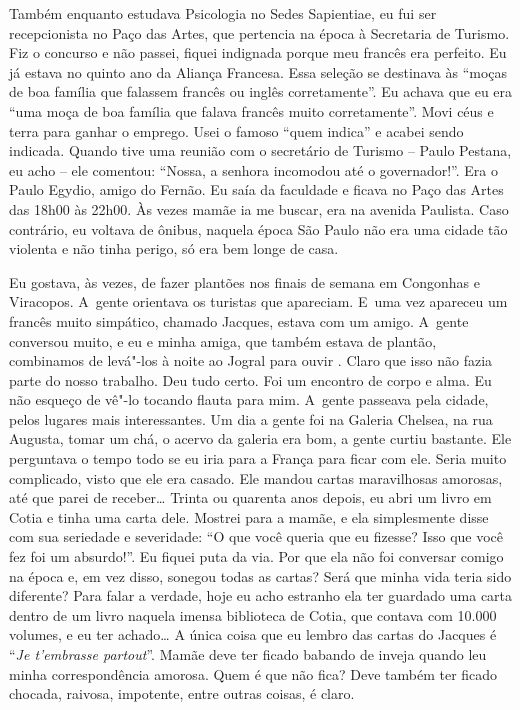 Também enquanto estudava Psicologia no Sedes Sapientiae, eu fui ser
recepcionista no Paço das Artes, que pertencia na época à Secretaria de
Turismo. Fiz o concurso e não passei, fiquei indignada porque meu
francês era perfeito. Eu já estava no quinto ano da Aliança Francesa.
Essa seleção se destinava às ``moças de boa família que falassem francês
ou inglês corretamente''. Eu achava que eu era ``uma moça de boa família
que falava francês muito corretamente''. Movi céus e terra para ganhar o
emprego. Usei o famoso ``quem indica'' e acabei sendo indicada. Quando
tive uma reunião com o secretário de Turismo -- Paulo Pestana, eu acho
-- ele comentou: ``Nossa, a senhora incomodou até o governador!''. Era o
Paulo Egydio, amigo do Fernão. Eu saía da faculdade e ficava no Paço das
Artes das 18h00 às 22h00. Às vezes mamãe ia me buscar, era na avenida
Paulista. Caso contrário, eu voltava de ônibus, naquela época São Paulo
não era uma cidade tão violenta e não tinha perigo, só era bem longe de
casa.

Eu gostava, às vezes, de fazer plantões nos finais de semana em
Congonhas e Viracopos. A~gente orientava os turistas que apareciam. E~uma vez apareceu um francês muito simpático, chamado Jacques, estava com
um amigo. A~gente conversou muito, e eu e minha amiga, que também estava
de plantão, combinamos de levá"-los à noite ao Jogral para ouvir .
Claro que isso não fazia parte do nosso trabalho. Deu tudo certo. Foi um
encontro de corpo e alma. Eu não esqueço de vê"-lo tocando flauta para
mim. A~gente passeava pela cidade, pelos lugares mais interessantes. Um
dia a gente foi na Galeria Chelsea, na rua Augusta, tomar um chá, o
acervo da galeria era bom, a gente curtiu bastante. Ele perguntava o
tempo todo se eu iria para a França para ficar com ele. Seria muito
complicado, visto que ele era casado. Ele mandou cartas maravilhosas
amorosas, até que parei de receber… Trinta ou quarenta anos
depois, eu abri um livro em Cotia e tinha uma carta dele. Mostrei para a
mamãe, e ela simplesmente disse com sua seriedade e severidade: ``O que
você queria que eu fizesse? Isso que você fez foi um absurdo!''. Eu
fiquei puta da via. Por que ela não foi conversar comigo na época e, em
vez disso, sonegou todas as cartas? Será que minha vida teria sido
diferente? Para falar a verdade, hoje eu acho estranho ela ter guardado
uma carta dentro de um livro naquela imensa biblioteca de Cotia, que
contava com 10.000 volumes, e eu ter achado… A única coisa que eu
lembro das cartas do Jacques é ``\emph{Je t'embrasse partout}''. Mamãe
deve ter ficado babando de inveja quando leu minha correspondência
amorosa. Quem é que não fica? Deve também ter ficado chocada, raivosa,
impotente, entre outras coisas, é claro.

